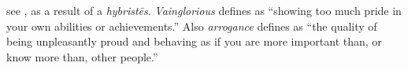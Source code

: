 \item[Vainglorious arrogance,]

see , as a result of a \emph{hybristēs}. \emph{Vainglorious} defines as ``showing too much pride in your own abilities or achievements.'' Also \emph{arrogance} defines as ``the quality of being unpleasantly proud and behaving as if you are more important than, or know more than, other people.''
